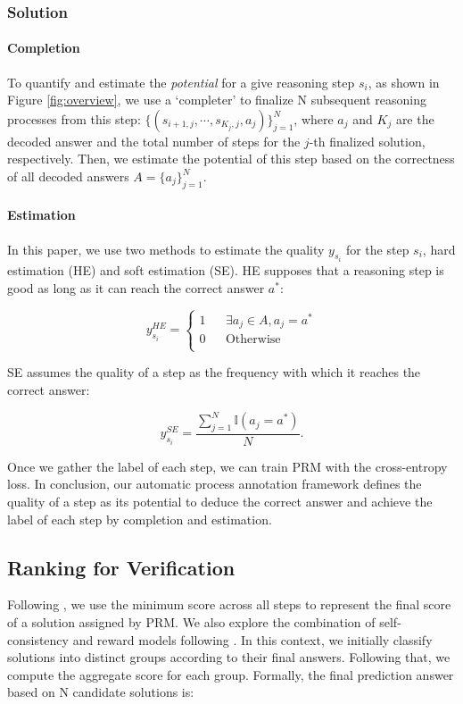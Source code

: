 \subsubsection{Solution}

\paragraph{Completion} To quantify and estimate the \textit{potential} for a give reasoning step $s_i$, as shown in Figure \ref{fig:overview},
we use a `completer' to finalize N subsequent reasoning processes from this step: $\{(s_{i+1,j}, \cdots, s_{K_j,j}, a_j)\}_{j=1}^N$, where $a_j$ and $K_j$ are the decoded answer and the total number of steps for the $j$-th finalized solution, respectively. Then, we estimate the potential of this step based on the correctness of all decoded answers $A=\{a_j\}_{j=1}^N$. 

\paragraph{Estimation} In this paper, we use two methods to estimate the quality $y_{s_i}$ for the step $s_i$, hard estimation (HE) and soft estimation (SE). HE supposes that a reasoning step is good as long as it can reach the correct answer $a^*$:

\begin{equation}
y_{s_i}^{HE}=\left\{
\begin{aligned}
1 & & \exists a_j \in A, a_j = a^*\\
0 & & \mathrm{Otherwise} \\
\end{aligned}
\right.
\end{equation}

SE assumes the quality of a step as the frequency with which it reaches the correct answer:

\begin{equation}
    y_{s_i}^{SE} = \frac{\sum_{j=1}^N\mathbb{I} (a_j = a^*)}{N}.
\end{equation}

Once we gather the label of each step, we can train PRM with the cross-entropy loss. In conclusion, our automatic process annotation framework defines the quality of a step as its potential to deduce the correct answer and achieve the label of each step by completion and estimation. 

\subsection{Ranking for Verification} Following \citep{lightman2023let}, we use the minimum score across all steps to represent the final score of a solution assigned by PRM. We also explore the combination of self-consistency and reward models following \citep{li-etal-2023-making}. In this context, we initially classify solutions into distinct groups according to their final answers. Following that, we compute the aggregate score for each group. Formally, the final prediction answer based on N candidate solutions is:

